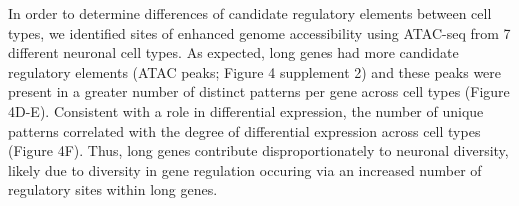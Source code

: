 In order to determine differences of candidate regulatory elements between cell types, we identified sites of enhanced genome accessibility using ATAC-seq \cite{Buenrostro_2013} from 7 different neuronal cell types. As expected, long genes had more candidate regulatory elements (ATAC peaks; Figure 4 supplement 2) and these peaks were present in a greater number of distinct patterns per gene across cell types (Figure 4D-E). Consistent with a role in differential expression, the number of unique patterns correlated with the degree of differential expression across cell types (Figure 4F). Thus, long genes contribute disproportionately to neuronal diversity, likely due to diversity in gene regulation occuring via an increased number of regulatory sites within long genes. 


